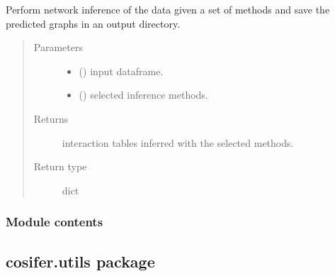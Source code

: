 \documentclass[letterpaper,10pt,english]{sphinxmanual}
\begin{document}
\begin{fulllineitems}
\label{\detokenize{_modules/cosifer.pipelines:cosifer.pipelines.pipeline_gui.run_inference}}
Perform network inference of the data given a set of methods
and save the predicted graphs in an output directory.
\begin{quote}\begin{description}
\item[{Parameters}] \leavevmode\begin{itemize}
\item {} 
 () \textendash{} input dataframe.

\item {} 
 () \textendash{} selected inference methods.

\end{itemize}

\item[{Returns}] \leavevmode
interaction tables inferred with the selected methods.

\item[{Return type}] \leavevmode
dict

\end{description}\end{quote}

\end{fulllineitems}



\subsubsection{Module contents}
\label{\detokenize{_modules/cosifer.pipelines:module-cosifer.pipelines}}\label{\detokenize{_modules/cosifer.pipelines:module-contents}}

\subsection{cosifer.utils package}
\label{\detokenize{_modules/cosifer.utils:cosifer-utils-package}}\label{\detokenize{_modules/cosifer.utils::doc}}
\end{document}
